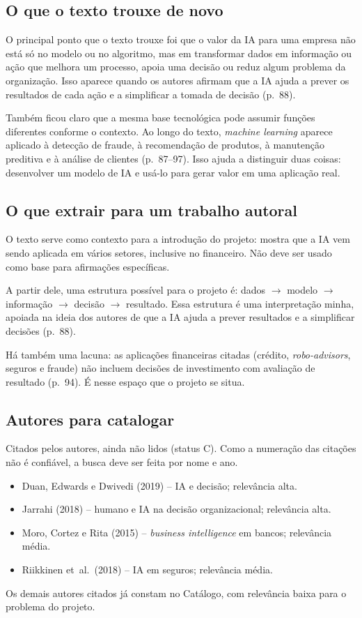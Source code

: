 \subsection*{O que o texto trouxe de novo}

O principal ponto que o texto trouxe foi que o valor da IA para uma empresa não está só no modelo ou no algoritmo, mas em transformar dados em informação ou ação que melhora um processo, apoia uma decisão ou reduz algum problema da organização. Isso aparece quando os autores afirmam que a IA ajuda a prever os resultados de cada ação e a simplificar a tomada de decisão (p.~88).

Também ficou claro que a mesma base tecnológica pode assumir funções diferentes conforme o contexto. Ao longo do texto, \emph{machine learning} aparece aplicado à detecção de fraude, à recomendação de produtos, à manutenção preditiva e à análise de clientes (p.~87--97). Isso ajuda a distinguir duas coisas: desenvolver um modelo de IA e usá-lo para gerar valor em uma aplicação real.

\subsection*{O que extrair para um trabalho autoral}

O texto serve como contexto para a introdução do projeto: mostra que a IA vem sendo aplicada em vários setores, inclusive no financeiro. Não deve ser usado como base para afirmações específicas.

A partir dele, uma estrutura possível para o projeto é: dados $\rightarrow$ modelo $\rightarrow$ informação $\rightarrow$ decisão $\rightarrow$ resultado. Essa estrutura é uma interpretação minha, apoiada na ideia dos autores de que a IA ajuda a prever resultados e a simplificar decisões (p.~88).

Há também uma lacuna: as aplicações financeiras citadas (crédito, \emph{robo-advisors}, seguros e fraude) não incluem decisões de investimento com avaliação de resultado (p.~94). É nesse espaço que o projeto se situa.

\subsection*{Autores para catalogar}

Citados pelos autores, ainda não lidos (status C). Como a numeração das citações não é confiável, a busca deve ser feita por nome e ano.

\begin{itemize}
  \item Duan, Edwards e Dwivedi (2019) -- IA e
        decisão; relevância alta.
  \item Jarrahi (2018) -- humano e IA na decisão
        organizacional; relevância alta.
  \item Moro, Cortez e Rita (2015) -- \emph{business
        intelligence} em bancos; relevância média.
  \item Riikkinen et~al.~(2018) -- IA em seguros;
        relevância média.
\end{itemize}

Os demais autores citados já constam no Catálogo, com relevância baixa para o problema do projeto.